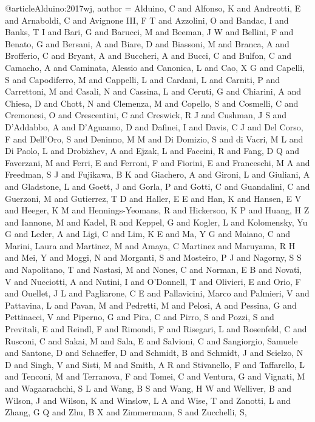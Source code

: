 {{@article{Alduino:2017wj,
author = {Alduino, C and Alfonso, K and Andreotti, E and Arnaboldi, C and Avignone III, F T and Azzolini, O and Bandac, I and Banks, T I and Bari, G and Barucci, M and Beeman, J W and Bellini, F and Benato, G and Bersani, A and Biare, D and Biassoni, M and Branca, A and Brofferio, C and Bryant, A and Buccheri, A and Bucci, C and Bulfon, C and Camacho, A and Caminata, Alessio and Canonica, L and Cao, X G and Capelli, S and Capodiferro, M and Cappelli, L and Cardani, L and Carniti, P and Carrettoni, M and Casali, N and Cassina, L and Ceruti, G and Chiarini, A and Chiesa, D and Chott, N and Clemenza, M and Copello, S and Cosmelli, C and Cremonesi, O and Crescentini, C and Creswick, R J and Cushman, J S and D'Addabbo, A and D'Aguanno, D and Dafinei, I and Davis, C J and Del Corso, F and Dell{\textquoteright}Oro, S and Deninno, M M and Di Domizio, S and di Vacri, M L and Di Paolo, L and Drobizhev, A and Ejzak, L and Faccini, R and Fang, D Q and Faverzani, M and Ferri, E and Ferroni, F and Fiorini, E and Franceschi, M A and Freedman, S J and Fujikawa, B K and Giachero, A and Gironi, L and Giuliani, A and Gladstone, L and Goett, J and Gorla, P and Gotti, C and Guandalini, C and Guerzoni, M and Gutierrez, T D and Haller, E E and Han, K and Hansen, E V and Heeger, K M and Hennings-Yeomans, R and Hickerson, K P and Huang, H Z and Iannone, M and Kadel, R and Keppel, G and Kogler, L and Kolomensky, Yu G and Leder, A and Ligi, C and Lim, K E and Ma, Y G and Maiano, C and Marini, Laura and Martinez, M and Amaya, C Martinez and Maruyama, R H and Mei, Y and Moggi, N and Morganti, S and Mosteiro, P J and Nagorny, S S and Napolitano, T and Nastasi, M and Nones, C and Norman, E B and Novati, V and Nucciotti, A and Nutini, I and O{\textquoteright}Donnell, T and Olivieri, E and Orio, F and Ouellet, J L and Pagliarone, C E and Pallavicini, Marco and Palmieri, V and Pattavina, L and Pavan, M and Pedretti, M and Pelosi, A and Pessina, G and Pettinacci, V and Piperno, G and Pira, C and Pirro, S and Pozzi, S and Previtali, E and Reindl, F and Rimondi, F and Risegari, L and Rosenfeld, C and Rusconi, C and Sakai, M and Sala, E and Salvioni, C and Sangiorgio, Samuele and Santone, D and Schaeffer, D and Schmidt, B and Schmidt, J and Scielzo, N D and Singh, V and Sisti, M and Smith, A R and Stivanello, F and Taffarello, L and Tenconi, M and Terranova, F and Tomei, C and Ventura, G and Vignati, M and Wagaarachchi, S L and Wang, B S and Wang, H W and Welliver, B and Wilson, J and Wilson, K and Winslow, L A and Wise, T and Zanotti, L and Zhang, G Q and Zhu, B X and Zimmermann, S and Zucchelli, S},
}}}
